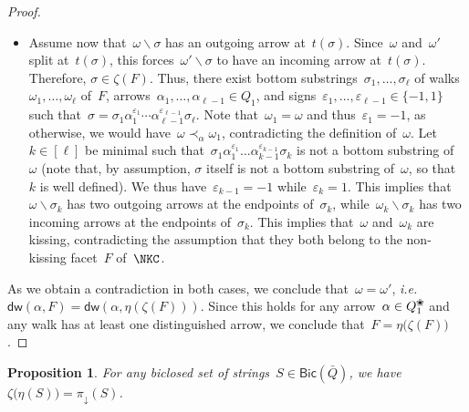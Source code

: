 \documentclass{amsart}
\newtheorem{proposition}[theorem]{Proposition}
\theoremstyle{definition}
\newcommand{\ssm}{\smallsetminus} %
\newcommand{\ie}{\textit{i.e.}~} %
\newcommand{\blossom}{^\text{\ding{96}}} %
\newcommand{\distinguishedWalk}[2]{\mathsf{dw}(#1,#2)} %
\newcommand{\Bicl}[1]{\mathsf{Bic}(#1)} %
\newcommand{\projDown}{\pi_\downarrow} %
\begin{document}
\begin{proof}
\begin{itemize}
\item Assume now that~$\omega \ssm \sigma$ has an outgoing arrow at~$t(\sigma)$. Since~$\omega$ and~$\omega'$ split at~$t(\sigma)$, this forces~$\omega' \ssm \sigma$ to have an incoming arrow at~$t(\sigma)$. Therefore, $\sigma \in \zeta(F)$. Thus, there exist bottom substrings~$\sigma_1, \dots, \sigma_\ell$ of walks~$\omega_1, \dots, \omega_\ell$ of~$F$, arrows~${\alpha_1, \dots, \alpha_{\ell-1} \in Q_1}$, and signs~$\varepsilon_1, \dots, \varepsilon_{\ell-1} \in \{-1,1\}$ such that~${\sigma = \sigma_1 \alpha_1^{\varepsilon_1} \cdots \alpha_{\ell-1}^{\varepsilon_{\ell-1}} \sigma_\ell}$. Note that~$\omega_1 = \omega$ and thus~$\varepsilon_1 = -1$, as otherwise, we would have~$\omega \prec_\alpha \omega_1$, contradicting the definition of~$\omega$. Let~$k \in [\ell]$ be minimal such that~$\sigma_1 \alpha_1^{\varepsilon_1} \dots \alpha_{k-1}^{\varepsilon_{k-1}} \sigma_k$ is not a bottom substring of~$\omega$ (note that, by assumption, $\sigma$ itself is not a bottom substring of~$\omega$, so that~$k$ is well defined). We thus have~$\varepsilon_{k-1} = -1$ while~$\varepsilon_k = 1$. This implies that~$\omega \ssm \sigma_k$ has two outgoing arrows at the endpoints of~$\sigma_k$, while~$\omega_k \ssm \sigma_k$ has two incoming arrows at the endpoints of~$\sigma_k$. This implies that~$\omega$ and~$\omega_k$ are kissing, contradicting the assumption that they both belong to the non-kissing facet~$F$ of~$\NKC$.
\end{itemize}
As we obtain a contradiction in both cases, we conclude that~$\omega = \omega'$, \ie $\distinguishedWalk{\alpha}{F} = \distinguishedWalk{\alpha}{\eta(\zeta(F))}$.
Since this holds for any arrow~$\alpha \in Q_1\blossom$ and any walk has at least one distinguished arrow, we conclude that~$F = \eta \big( \zeta(F) \big)$.
\end{proof}

\begin{proposition}
\label{prop:section}
For any biclosed set of strings~$S \in \Bicl{\bar Q}$, we have~$\zeta \big( \eta(S) \big) = \projDown(S)$.
\end{proposition}
\end{document}

